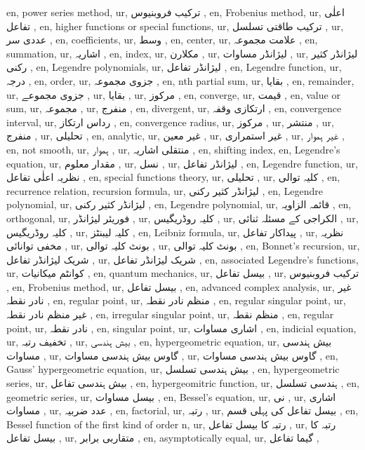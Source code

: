 en, power series method,
ur, ترکیب فروبنیوس ,
en, Frobenius method,
ur, اعلٰی تفاعل ,
en, higher functions or special functions,
ur, ترکیب طاقتی تسلسل ,
ur, عددی سر ,
en, coefficients,
ur, وسط ,
en, center,
ur, علامت مجموعہ ,
en, summation,
ur, اشاریہ ,
en, index,
ur, مکلارن ,
ur, لیژانڈر مساوات ,
ur, لیژانڈر کثیر رکنی ,
en, Legendre polynomials,
ur, لیژانڈر تفاعل ,
en, Legendre function,
ur, درجہ ,
en, order,
ur, جزوی مجموعہ ,
en, nth partial sum,
ur, بقایا ,
en, remainder,
ur, جزوی مجموعے ,
ur, بقایا ,
ur, مرکوز ,
en, converge,
ur, قیمت ,
en, value or sum,
ur, مجموعہ ,
ur, منفرج ,
en, divergent,
ur, ارتکازی وقفہ ,
en, convergence interval,
ur, رداس ارتکاز ,
en, convergence radius,
ur, مرکوز ,
ur, منتشر ,
ur, منفرج ,
ur, تحلیلی ,
en, analytic,
ur, غیر معین ,
ur, غیر استمراری ,
ur, غیر ہموار ,
en, not smooth,
ur, ہموار ,
ur, منتقلی اشاریہ ,
en, shifting index,
en, Legendre's equation,
ur, مقدار معلوم ,
ur, نسل ,
ur, لیژانڈر تفاعل ,
en, Legendre function,
ur, نظریہ اعلٰی تفاعل ,
en, special functions theory,
ur, تحلیلی ,
ur, کلیہ توالی ,
en, recurrence relation, recursion formula,
ur, لیژانڈر کثیر رکنی ,
en, Legendre polynomial,
ur, لیژانڈر کثیر رکنی ,
en, Legendre polynomial,
ur, قائمہ الزاویہ ,
en, orthogonal,
ur, فوریئر لیژانڈر ,
ur, کلیہ روڈریگیس ,
ur, الکراجی کے مسئلہ ثنائی ,
ur, کلیہ روڈریگیس ,
ur, کلیہ لیبنٹز ,
en, Leibniz formula,
ur, پیداکار تفاعل ,
ur, نظریہ مخفی توانائی ,
ur, بونٹ کلیہ توالی ,
ur, بونٹ کلیہ توالی ,
en, Bonnet's recursion,
ur, شریک لیژانڈر تفاعل ,
ur, شریک لیژانڈر تفاعل ,
en, associated Legendre's functions,
ur, کوانٹم میکانیات ,
en, quantum mechanics,
ur, بیسل تفاعل ,
ur, ترکیب فروبنیوس ,
en, Frobenius method,
ur, بیسل تفاعل ,
en, advanced complex analysis,
ur, غیر نادر نقطہ ,
en, regular point,
ur, منظم نادر نقطہ ,
en, regular singular point,
ur, غیر منظم نادر نقطہ ,
en, irregular singular point,
ur, منظم نقطہ ,
en, regular point,
ur, نادر نقطہ ,
en, singular point,
ur, اشاری مساوات ,
en, indicial equation,
ur, تخفیف رتبہ ,
ur, بیش ہندسی ,
en, hypergeometric equation,
ur, بیش ہندسی مساوات ,
ur, گاوس بیش ہندسی مساوات ,
ur, گاوس بیش ہندسی مساوات ,
en, Gauss' hypergeometric equation,
ur, بیش ہندسی تسلسل ,
en, hypergeometric series,
ur, بیش ہندسی تفاعل ,
en, hypergeomitric function,
ur, ہندسی تسلسل ,
en, geometric series,
ur, بیسل مساوات ,
en, Bessel's equation,
ur, نی ,
ur, اشاری مساوات ,
ur, عدد ضربیہ ,
en, factorial,
ur, رتبہ ,
ur, بیسل تفاعل کی پہلی قسم ,
en, Bessel function of the first kind of order n,
ur, رتبہ  کا بیسل تفاعل ,
ur, رتبہ  کا بیسل تفاعل ,
ur, متقاربی برابر ,
en, asymptotically equal,
ur, گیما تفاعل ,
